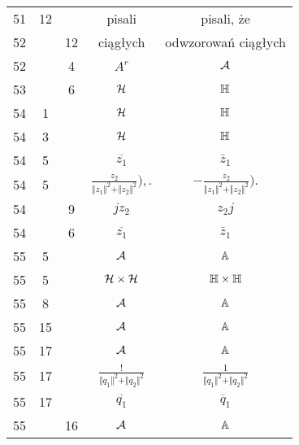 \documentclass[a4paper,11pt]{article}
\begin{document}
\begin{center}
\begin{tabular}{|c|c|c|c|c|}
    51  & 12 & & pisali & pisali, że \\
    52  & & 12 & ciągłych & odwzorowań ciągłych \\
    52  & &  4 & $A^{ r }$ & $\mathcal{A}$ \\
    53  & &  6 & $\mathcal{H}$ & $\mathbb{H}$ \\
    54  &  1 & & $\mathcal{H}$ & $\mathbb{H}$ \\
    54  &  3 & & $\mathcal{H}$ & $\mathbb{H}$ \\
    54  &  5 & & $\overline{ z_{ 1 } }$ & $\bar{ z }_{ 1 }$ \\
    54  &  5 & & $\frac{ z_{ 2 } }
                 { \Vert z_{ 1 } \Vert^{ 2 } + \Vert z_{ 2 } \Vert^{ 2 } } ),.$
           & $-\frac{ z_{ 2 } }
             { \Vert z_{ 1 } \Vert^{ 2 } + \Vert z_{ 2 } \Vert^{ 2 } } ).$ \\
    54  & &  9 & $j z_{ 2 }$ & $z_{ 2 } j$ \\
    54  & &  6 & $\overline{ z_{ 1 } }$ & $\bar{ z }_{ 1 }$ \\
    55  &  5 & & $\mathcal{A}$ & $\mathbb{A}$ \\
    55  &  5 & & $\mathcal{H} \times \mathcal{H}$ & $\mathbb{H} \times \mathbb{H}$ \\
    55  &  8 & & $\mathcal{A}$ & $\mathbb{A}$ \\
    55  & 15 & & $\mathcal{A}$ & $\mathbb{A}$ \\
    55  & 17 & & $\mathcal{A}$ & $\mathbb{A}$ \\
    55  & 17 & & $\frac{ ! }
                 { \Vert q_{ 1 } \Vert^{ 2 } + \Vert q_{ 2 } \Vert^{ 2 } }$
           & $\frac{ 1 }
             { \Vert q_{ 1 } \Vert^{ 2 } + \Vert q_{ 2 } \Vert^{ 2 } }$ \\
    55  & 17 & & $\overline{ q_{ 1 } }$ & $\overline{ q }_{ 1 }$ \\
    55  & & 16 & $\mathcal{A}$ & $\mathbb{A}$ \\
    \hline
  \end{tabular}






\end{center}
\end{document}
